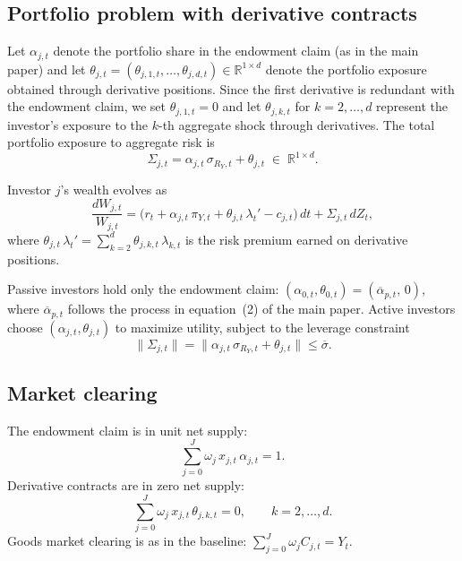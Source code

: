 \documentclass[11pt,english]{article}
\begin{document}
\subsection{Portfolio problem with derivative contracts}

Let $\alpha_{j,t}$ denote the portfolio share in the endowment claim (as in the main paper) and let $\theta_{j,t}=(\theta_{j,1,t},\ldots,\theta_{j,d,t})\in\mathbb{R}^{1\times d}$ denote the portfolio exposure obtained through derivative positions. Since the first derivative is redundant with the endowment claim, we set $\theta_{j,1,t}=0$ and let $\theta_{j,k,t}$ for $k=2,\ldots,d$ represent the investor's exposure to the $k$-th aggregate shock through derivatives. The total portfolio exposure to aggregate risk is
\begin{equation}\label{eq:total_exposure}
    \Sigma_{j,t} = \alpha_{j,t}\,\sigma_{R_Y,t} + \theta_{j,t} \;\in\; \mathbb{R}^{1\times d}.
\end{equation}

Investor $j$'s wealth evolves as
\begin{equation}\label{eq:wealth_complete}
    \frac{dW_{j,t}}{W_{j,t}} = \big(r_t + \alpha_{j,t}\,\pi_{Y,t} + \theta_{j,t}\,\lambda_t' - c_{j,t}\big)\,dt + \Sigma_{j,t}\,dZ_t,
\end{equation}
where $\theta_{j,t}\,\lambda_t'=\sum_{k=2}^d \theta_{j,k,t}\,\lambda_{k,t}$ is the risk premium earned on derivative positions.

Passive investors hold only the endowment claim: $(\alpha_{0,t},\theta_{0,t})=(\overline{\alpha}_{p,t},\,0)$, where $\overline{\alpha}_{p,t}$ follows the process in equation~(2) of the main paper. Active investors choose $(\alpha_{j,t},\theta_{j,t})$ to maximize utility, subject to the leverage constraint
\begin{equation}\label{eq:leverage_complete}
    \|\Sigma_{j,t}\| = \|\alpha_{j,t}\,\sigma_{R_Y,t} + \theta_{j,t}\| \le \overline{\sigma}.
\end{equation}

\subsection{Market clearing}

The endowment claim is in unit net supply:
\[
    \sum_{j=0}^J \omega_j\, x_{j,t}\,\alpha_{j,t} = 1.
\]
Derivative contracts are in zero net supply:
\[
    \sum_{j=0}^J \omega_j\, x_{j,t}\,\theta_{j,k,t} = 0, \qquad k=2,\ldots,d.
\]
Goods market clearing is as in the baseline: $\sum_{j=0}^J \omega_j C_{j,t} = Y_t$.
\end{document}
